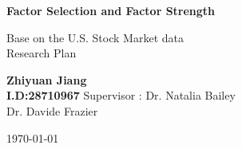 \begin{titlepage}
\begin{center}
\vspace*{1cm}
\Huge
\textbf{Factor Selection and Factor Strength}

\vspace{0.5cm}
\LARGE
Base on the U.S. Stock Market data\\
Research Plan 

\vspace{1.5 cm}
\textbf{Zhiyuan Jiang\\I.D:28710967}
\vfill
 Supervisor : Dr. Natalia Bailey\\\hspace{39mm} Dr. Davide Frazier
 \vspace{0.8cm}
 
\Large
\today
\end{center}
\end{titlepage}